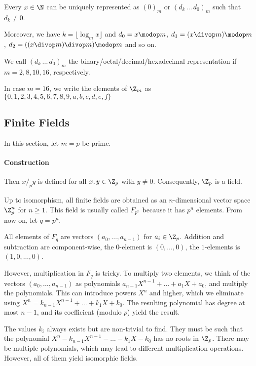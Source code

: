 \begin{theorem}\label{thm:math:base}
Every $x\in\N$ can be uniquely represented as $(0)_m$ or $(d_k\,\ldots\,d_0)_m$ such that $d_k\neq 0$.

Moreover, we have $k=\lfloor \log_m x \rfloor$ and  $d_0=x\modop m$, $d_1=(x\divop m)\modop m$, $d_2=((x\divop m)\divop m)\modop m$ and so on.
\end{theorem}

\begin{example}
We call $(d_k\,\ldots\,d_0)_m$ the binary/octal/decimal/hexadecimal representation if $m=2,8,10,16$, respectively.

In case $m=16$, we write the elements of $\Z_m$ as $\{0,1,2,3,4,5,6,7,8,9,a,b,c,d,e,f\}$
\end{example}

\subsection{Finite Fields}\label{sec:math:finfield}

In this section, let $m=p$ be prime.

\paragraph{Construction}
Then $x/_p y$ is defined for all $x,y\in\Z_p$ with $y\neq 0$.
Consequently, $\Z_p$ is a field.

Up to isomorphism, all finite fields are obtained as an $n$-dimensional vector space $\Z_p^n$ for $n\geq 1$.
This field is usually called $F_{p^n}$ because it has $p^n$ elements.
From now on, let $q=p^n$.

All elements of $F_q$ are vectors $(a_0,\ldots,a_{n-1})$ for $a_i\in\Z_p$.
Addition and subtraction are component-wise, the $0$-element is $(0,\ldots,0)$, the $1$-elements is $(1,0,\ldots,0)$.

However, multiplication in $F_q$ is tricky.
To multiply two elements, we think of the vectors $(a_0,\ldots,a_{n-1})$ as polynomials $a_{n-1}X^{n-1}+\ldots+a_1X+a_0$, and multiply the polynomials.
This can introduce powers $X^n$ and higher, which we eliminate using $X^n=k_{n-1}X^{n-1}+\ldots+k_1X+k_0$.
The resulting polynomial has degree at most $n-1$, and its coefficient (modulo $p$) yield the result.

The values $k_i$ always exists but are non-trivial to find.
They must be such that the polynomial $X^n-k_{n-1}X^{n-1}-\ldots-k_1X-k_0$ has no roots in $\Z_p$.
There may be multiple polynomials, which may lead to different multiplication operations.
However, all of them yield isomorphic fields.

